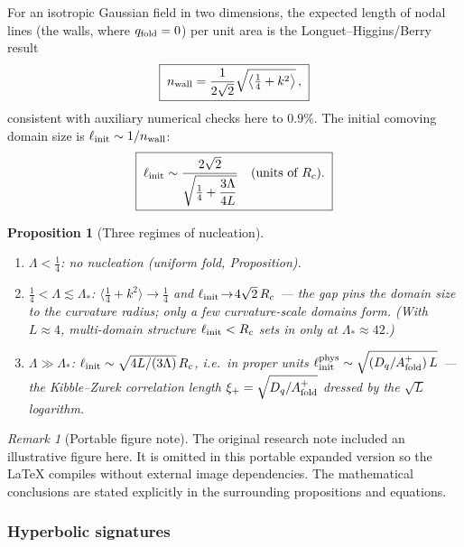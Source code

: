 \documentclass[11pt,a4paper]{article}
\newcommand{\qf}{q_{\rm fold}}
\newcommand{\Af}{A_{\rm fold}}
\newcommand{\Dq}{D_q}
\newcommand{\Lam}{\Lambda}
\newcommand{\Rc}{R_c}
\theoremstyle{plain}
\newtheorem{proposition}{Proposition}[section]
\theoremstyle{definition}
\theoremstyle{remark}
\newtheorem{remark}{Remark}[section]
\begin{document}
For an isotropic Gaussian field in two dimensions, the expected length of nodal lines (the walls, where
$\qf=0$) per unit area is the Longuet--Higgins/Berry result
\begin{equation}
\boxed{\;n_{\rm wall}=\frac{1}{2\sqrt2}\sqrt{\bigl\langle\tfrac14+k^2\bigr\rangle}\,,\;}
\end{equation}
consistent with auxiliary numerical checks here to $0.9\%$. The initial comoving domain size is $\ell_{\rm init}\sim
1/n_{\rm wall}$:
\begin{equation}
\boxed{\;\ell_{\rm init}\sim\frac{2\sqrt2}{\sqrt{\tfrac14+\dfrac{3\Lam}{4L}}}\quad(\text{units of }\Rc).\;}
\end{equation}

\begin{proposition}[Three regimes of nucleation]
\leavevmode
\begin{enumerate}[label=(\roman*),leftmargin=1.8em,itemsep=2pt]
\item $\Lam<\tfrac14$: no nucleation (uniform fold, Proposition).
\item $\tfrac14<\Lam\lesssim\Lam_\ast$: $\langle\tfrac14+k^2\rangle\!\to\!\tfrac14$ and
$\ell_{\rm init}\!\to\!4\sqrt2\,\Rc$ --- the gap pins the domain size to the curvature radius; only a few
curvature-scale domains form. (With $L\!\approx\!4$, multi-domain structure $\ell_{\rm init}<\Rc$ sets in
only at $\Lam_\ast\approx42$.)
\item $\Lam\gg\Lam_\ast$: $\ell_{\rm init}\sim\sqrt{4L/(3\Lam)}\,\Rc$, i.e.\ in proper units
$\ell_{\rm init}^{\rm phys}\sim\sqrt{(\Dq/\Af^+)\,L}$ --- the Kibble--Zurek correlation length
$\xi_+=\sqrt{\Dq/\Af^+}$ dressed by the $\sqrt{L}$ logarithm.
\end{enumerate}
\end{proposition}


\begin{remark}[Portable figure note]
The original research note included an illustrative figure here. It is omitted in this portable expanded version so the LaTeX compiles without external image dependencies. The mathematical conclusions are stated explicitly in the surrounding propositions and equations.\end{remark}


\subsubsection{Hyperbolic signatures}
\end{document}
